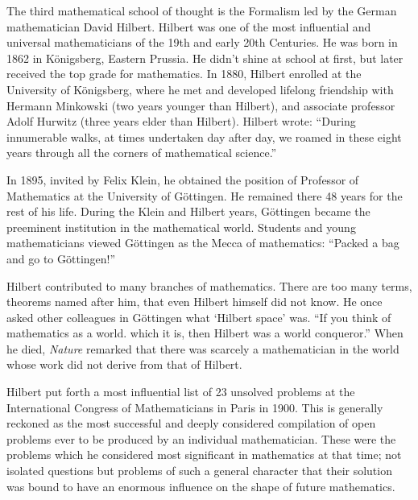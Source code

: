 \documentclass[b5paper]{article}
\begin{document}
The third mathematical school of thought is the Formalism led by the German mathematician David Hilbert. Hilbert was one of the most influential and universal mathematicians of the 19th and early 20th Centuries. He was born in 1862 in Königsberg, Eastern Prussia. He didn't shine at school at first, but later received the top grade for mathematics. In 1880, Hilbert enrolled at the University of Königsberg, where he met and developed lifelong friendship with Hermann Minkowski (two years younger than Hilbert), and associate professor Adolf Hurwitz (three years elder than Hilbert). Hilbert wrote: ``During innumerable walks, at times undertaken day after day, we roamed in these eight years through all the corners of mathematical science.''

In 1895, invited by Felix Klein, he obtained the position of Professor of Mathematics at the University of Göttingen. He remained there 48 years for the rest of his life. During the Klein and Hilbert years, Göttingen became the preeminent institution in the mathematical world. Students and young mathematicians viewed Göttingen as the Mecca of mathematics: ``Packed a bag and go to Göttingen!''

Hilbert contributed to many branches of mathematics. There are too many terms, theorems named after him, that even Hilbert himself did not know. He once asked other colleagues in Göttingen what `Hilbert space' was. ``If you think of mathematics as a world. which it is, then Hilbert was a world conqueror.'' When he died, {\em Nature} remarked that there was scarcely a mathematician in the world whose work did not derive from that of Hilbert.\cite{Ried-1996}

Hilbert put forth a most influential list of 23 unsolved problems at the International Congress of Mathematicians in Paris in 1900. This is generally reckoned as the most successful and deeply considered compilation of open problems ever to be produced by an individual mathematician. These were the problems which he considered most significant in mathematics at that time; not isolated questions but problems of such a general character that their solution was bound to have an enormous influence on the shape of future mathematics.
\end{document}
